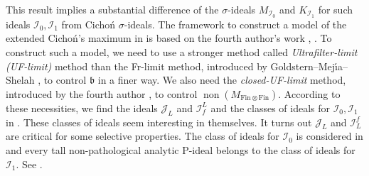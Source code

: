 \documentclass[a4paper,12pt]{amsart}
\theoremstyle{definition}
\numberwithin{thm}{section}
\numberwithin{equation}{section}
\newcommand{\bb}{\mathfrak{b}}
\DeclareMathOperator{\non}{non}
\newcommand{\I}{\mathscr{I}}
\newcommand{\J}{\mathscr{J}}
\newcommand{\finfin}{\mathrm{Fin}\otimes\mathrm{Fin}}
\newcommand{\IL}{\I_{L}}
\begin{document}
    This result implies a substantial difference of the $\sigma$-ideals $M_{\I_0}$ and $K_{\I_1}$ for such ideals $\I_0,\I_1$ from Cicho\'n $\sigma$-ideals.
    The framework to construct a model of the extended Cicho\'n's maximum in  is based on the fourth author's work \cite{Yam25}, \cite{Yam24}. To construct such a model, we need to use a stronger method called \emph{Ultrafilter-limit (UF-limit)} method than the Fr-limit method, introduced by Goldstern--Mej{\'\i}a--Shelah \cite{GMS16}, to control $\bb$ in a finer way. We also need the \emph{closed-UF-limit} method, introduced by the fourth author \cite{Yam24}, to control $\non(M_{\finfin})$. According to these necessities, we find the ideals $\J_L$ and $\I^L_f$ and the classes of ideals for $\I_0,\I_1$ in .
    These classes of ideals seem interesting in themselves. It turns out $\J_L$ and $\IL^f$ are critical for some selective properties. The class of ideals for $\I_0$ is considered in \cite{DFGT21} and every tall non-pathological analytic P-ideal belongs to the class of ideals for $\I_1$. See .
\end{document}
